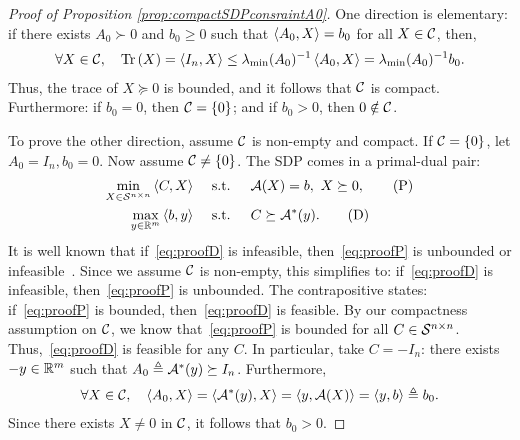\begin{proof}[Proof of Proposition \ref{prop:compactSDPconsraintA0}]
	One direction is elementary: if there exists $A_0 \succ 0$ and $b_0 \geq 0$ such that $\left\langle A_0, X \right\rangle = b_0$ for all $X \in \mathcal{C}$, then,
	\begin{align*}
		\forall X \in \mathcal{C}, \quad \mathrm{Tr}\left(X\right) = \left\langle I_n, X \right\rangle \leq \lambda_{\min}(A_0)^{-1} \left\langle A_0, X \right\rangle = \lambda_{\min}(A_0)^{-1} b_0.
	\end{align*}
	Thus, the trace of $X \succeq 0$ is bounded, and it follows that $\mathcal{C}$ is compact. Furthermore: if $b_0 = 0$, then $\mathcal{C} = \{0\}$; and if $b_0 > 0$, then $0 \notin \mathcal{C}$.
	
	To prove the other direction, assume $\mathcal{C}$ is non-empty and compact. If $\mathcal{C} = \{0\}$, let $A_0 = I_n, b_0 = 0$. Now assume $\mathcal{C} \neq \{0\}$. The SDP comes in a primal-dual pair:
	\begin{align*}
	\min_{X\in\mathcal{S}^{n\times n}} \left\langle C, X \right\rangle \quad & \textrm{ s.t. } \quad \mathcal{A}(X) = b, \ X \succeq 0, \tag{P} \label{eq:proofP}\\
	\max_{y\in\mathbb{R}^m} \left\langle b, y \right\rangle \quad & \textrm{ s.t. } \quad C \succeq \mathcal{A}^*(y). \tag{D} \label{eq:proofD}
	\end{align*}
	It is well known that if~\eqref{eq:proofD} is infeasible, then~\eqref{eq:proofP} is unbounded or infeasible~\citep[Thm.~4.1(a)]{wolkowicz1981optimization}. Since we assume $\mathcal{C}$ is non-empty, this simplifies to: if~\eqref{eq:proofD} is infeasible, then~\eqref{eq:proofP} is unbounded. The contrapositive states: if~\eqref{eq:proofP} is bounded, then~\eqref{eq:proofD} is feasible. By our compactness assumption on $\mathcal{C}$, we know that~\eqref{eq:proofP} is bounded for all $C \in \mathcal{S}^{n\times n}$. Thus,~\eqref{eq:proofD} is feasible for any $C$. In particular, take $C = -I_n$: there exists $-y \in \mathbb{R}^m$ such that $A_0 \triangleq \mathcal{A}^*(y) \succeq I_n$. Furthermore,
	\begin{align*}
		\forall X \in \mathcal{C}, \quad \left\langle A_0, X \right\rangle = \left\langle \mathcal{A}^*(y), X \right\rangle = \left\langle y, \mathcal{A}(X) \right\rangle = \left\langle y, b \right\rangle \triangleq b_0.
	\end{align*}
	Since there exists $X \neq 0$ in $\mathcal{C}$, it follows that $b_0 > 0$.
\end{proof}

